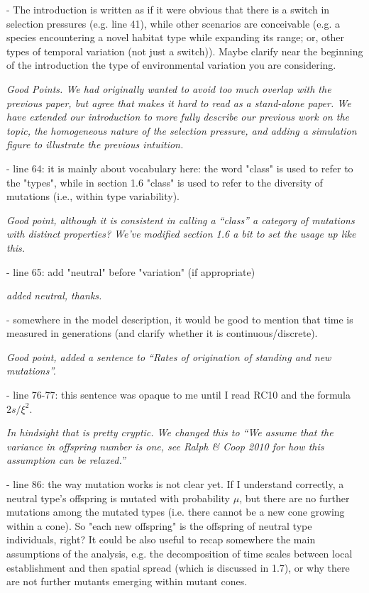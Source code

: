 \documentclass[12pt,letterpaper]{article}
\newcommand{\response}[1]{\emph{ \color{blue} #1}}
\begin{document}
- The introduction is written as if it were obvious that there is a switch in selection pressures (e.g. line 41), while other scenarios are conceivable (e.g. a species encountering a novel habitat type while expanding its range; or, other types of temporal variation (not just a switch)). Maybe clarify near the beginning of the introduction the type of environmental variation you are considering.

\response{Good Points. We had originally wanted to avoid too much overlap with the previous paper, but agree that makes it hard to read as a stand-alone paper. We have extended our introduction to more fully describe our previous work on the topic, the homogeneous nature of the selection pressure, and adding a simulation figure to illustrate the previous intuition. }

- line 64: it is mainly about vocabulary here: the word "class" is used to refer to the "types", while in section 1.6 "class" is used to refer to the diversity of mutations (i.e., within type variability).

\response{Good point, although it is consistent in calling a ``class'' a category of mutations with distinct properties? We've modified section 1.6 a bit to set the usage up like this.}


- line 65: add "neutral" before "variation" (if appropriate)

\response{added neutral, thanks.}

- somewhere in the model description, it would be good to mention that time is measured in generations (and clarify whether it is continuous/discrete).


\response{Good point, added a sentence to ``Rates of origination of standing and new mutations''.}

- line 76-77: this sentence was opaque to me until I read RC10 and the formula $2s/\xi^2$.

\response{In hindsight that is pretty cryptic. We changed this to ``We assume that the variance in offspring number is one, see
  Ralph \& Coop 2010 for how this assumption can be relaxed.''}

- line 86: the way mutation works is not clear yet. If I understand correctly, a neutral type's offspring is mutated with probability $\mu$, but there are no further mutations among the mutated types (i.e. there cannot be a new cone growing within a cone). So "each new offspring" is the offspring of neutral type individuals, right? It could be also useful to recap somewhere the main assumptions of the analysis, e.g. the decomposition of time scales between local establishment and then spatial spread (which is discussed in 1.7), or why there are not further mutants emerging within mutant cones.
\end{document}
